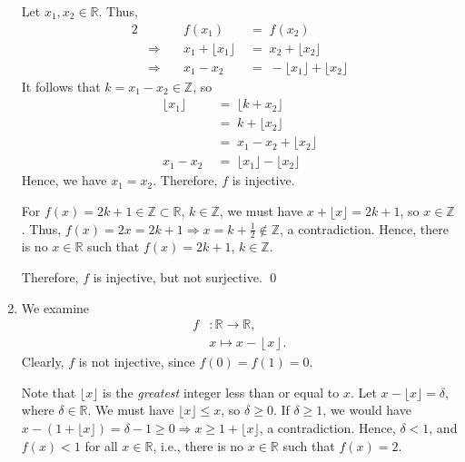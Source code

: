 \documentclass[10pt]{article}
\begin{document}
\begin{enumerate}
                Let $x_1, x_2 \in \mathbb{R}$. Thus,
                \begin{alignat*}{2}
                        &&f(x_1) \;&=\; f(x_2) \\
                        &\Rightarrow\quad& x_1 + \lfloor x_1\rfloor \;&=\; x_2 + \lfloor x_2\rfloor \\
                        &\Rightarrow\quad& x_1 - x_2 \;&=\; -\lfloor x_1\rfloor + \lfloor x_2\rfloor
                \end{alignat*}
                It follows that $k = x_1 - x_2 \in \mathbb{Z}$, so
                \begin{align*}
                \lfloor x_1\rfloor \;&=\; \lfloor k + x_2\rfloor \\
                        \;&=\; k + \lfloor x_2\rfloor \\
                        \;&=\; x_1 - x_2 + \lfloor x_2 \rfloor \\
                x_1 - x_2 \;&=\; \lfloor x_1\rfloor - \lfloor x_2 \rfloor
                \end{align*}
                Hence, we have $x_1 = x_2$. Therefore, $f$ is injective.

                For $f(x) = 2k + 1 \in \mathbb{Z} \subset \mathbb{R}$, $k \in \mathbb{Z}$, we must have $x + \lfloor x \rfloor = 2k + 1$, so 
                $x \in \mathbb{Z}$. Thus, $f(x) = 2x = 2k + 1 \Rightarrow x = k + \frac{1}{2} \notin \mathbb{Z}$, a contradiction. Hence, there
                is no $x \in \mathbb{R}$ such that $f(x) = 2k + 1$, $k \in \mathbb{Z}$.
                
                Therefore, $f$ is injective, but not surjective. \qed

                \item We examine
                \begin{align*}
                        f&: \mathbb{R} \to \mathbb{R},\\
                        &x \mapsto x - \left\lfloor x \right\rfloor .
                \end{align*}
                Clearly, $f$ is not injective, since $f(0) = f(1) = 0$.

                Note that $\lfloor x\rfloor$ is the \textit{greatest} integer less than or equal to $x$.
                Let $x - \lfloor x\rfloor = \delta$, where $\delta \in \mathbb{R}$.
                We must have $\lfloor x\rfloor \leq x$, so $\delta \geq 0$.
                If $\delta \geq 1$, we would have 
                $x - (1 + \lfloor x\rfloor) = \delta - 1 \geq 0 \Rightarrow x \geq 1 + \lfloor x\rfloor$, a contradiction.
                Hence, $\delta < 1$, and $f(x) < 1$ for all $x \in \mathbb{R}$, i.e., there is no $x \in \mathbb{R}$ such that $f(x) = 2$.


\end{enumerate}
\end{document}
